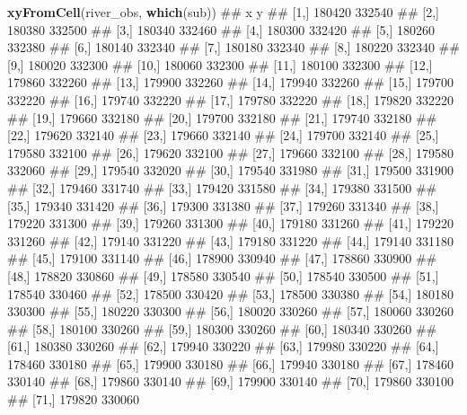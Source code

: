 \documentclass[11pt,ignorenonframetext,]{beamer}
\newenvironment{Shaded}{}{}
\newcommand{\KeywordTok}[1]{\textcolor[rgb]{0.00,0.44,0.13}{\textbf{#1}}}
\newcommand{\NormalTok}[1]{#1}
\let\oldShaded\Shaded
\let\endoldShaded\endShaded
\renewenvironment{Shaded}{\footnotesize\begin{spacing}{0.9}\oldShaded}{\endoldShaded\end{spacing}}
\begin{document}
\begin{frame}[fragile,t]{}
\begin{Shaded}
\begin{Highlighting}[]
\KeywordTok{xyFromCell}\NormalTok{(river_obs, }\KeywordTok{which}\NormalTok{(sub))}
\NormalTok{##            x      y}
\NormalTok{##  [1,] 180420 332540}
\NormalTok{##  [2,] 180380 332500}
\NormalTok{##  [3,] 180340 332460}
\NormalTok{##  [4,] 180300 332420}
\NormalTok{##  [5,] 180260 332380}
\NormalTok{##  [6,] 180140 332340}
\NormalTok{##  [7,] 180180 332340}
\NormalTok{##  [8,] 180220 332340}
\NormalTok{##  [9,] 180020 332300}
\NormalTok{## [10,] 180060 332300}
\NormalTok{## [11,] 180100 332300}
\NormalTok{## [12,] 179860 332260}
\NormalTok{## [13,] 179900 332260}
\NormalTok{## [14,] 179940 332260}
\NormalTok{## [15,] 179700 332220}
\NormalTok{## [16,] 179740 332220}
\NormalTok{## [17,] 179780 332220}
\NormalTok{## [18,] 179820 332220}
\NormalTok{## [19,] 179660 332180}
\NormalTok{## [20,] 179700 332180}
\NormalTok{## [21,] 179740 332180}
\NormalTok{## [22,] 179620 332140}
\NormalTok{## [23,] 179660 332140}
\NormalTok{## [24,] 179700 332140}
\NormalTok{## [25,] 179580 332100}
\NormalTok{## [26,] 179620 332100}
\NormalTok{## [27,] 179660 332100}
\NormalTok{## [28,] 179580 332060}
\NormalTok{## [29,] 179540 332020}
\NormalTok{## [30,] 179540 331980}
\NormalTok{## [31,] 179500 331900}
\NormalTok{## [32,] 179460 331740}
\NormalTok{## [33,] 179420 331580}
\NormalTok{## [34,] 179380 331500}
\NormalTok{## [35,] 179340 331420}
\NormalTok{## [36,] 179300 331380}
\NormalTok{## [37,] 179260 331340}
\NormalTok{## [38,] 179220 331300}
\NormalTok{## [39,] 179260 331300}
\NormalTok{## [40,] 179180 331260}
\NormalTok{## [41,] 179220 331260}
\NormalTok{## [42,] 179140 331220}
\NormalTok{## [43,] 179180 331220}
\NormalTok{## [44,] 179140 331180}
\NormalTok{## [45,] 179100 331140}
\NormalTok{## [46,] 178900 330940}
\NormalTok{## [47,] 178860 330900}
\NormalTok{## [48,] 178820 330860}
\NormalTok{## [49,] 178580 330540}
\NormalTok{## [50,] 178540 330500}
\NormalTok{## [51,] 178540 330460}
\NormalTok{## [52,] 178500 330420}
\NormalTok{## [53,] 178500 330380}
\NormalTok{## [54,] 180180 330300}
\NormalTok{## [55,] 180220 330300}
\NormalTok{## [56,] 180020 330260}
\NormalTok{## [57,] 180060 330260}
\NormalTok{## [58,] 180100 330260}
\NormalTok{## [59,] 180300 330260}
\NormalTok{## [60,] 180340 330260}
\NormalTok{## [61,] 180380 330260}
\NormalTok{## [62,] 179940 330220}
\NormalTok{## [63,] 179980 330220}
\NormalTok{## [64,] 178460 330180}
\NormalTok{## [65,] 179900 330180}
\NormalTok{## [66,] 179940 330180}
\NormalTok{## [67,] 178460 330140}
\NormalTok{## [68,] 179860 330140}
\NormalTok{## [69,] 179900 330140}
\NormalTok{## [70,] 179860 330100}
\NormalTok{## [71,] 179820 330060}

\end{Highlighting}
\end{Shaded}
\end{frame}
\end{document}
